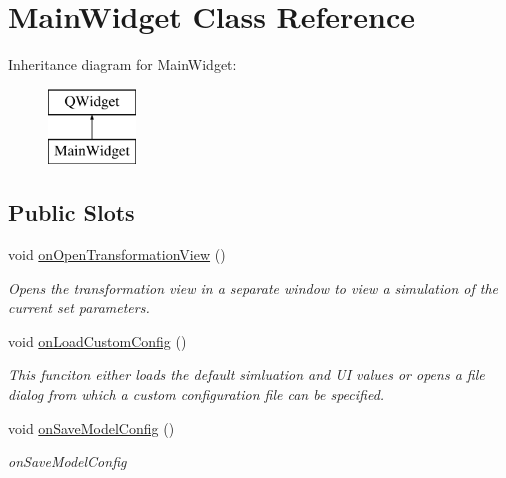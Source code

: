 \hypertarget{class_main_widget}{}\section{Main\+Widget Class Reference}
\label{class_main_widget}
Inheritance diagram for Main\+Widget\+:\begin{figure}[H]
\begin{center}
\leavevmode
\includegraphics[height=2.000000cm]{class_main_widget}
\end{center}
\end{figure}
\subsection*{Public Slots}
\begin{DoxyCompactItemize}
\item 
\mbox{\label{class_main_widget_af956e8da220cd6ca378cfc0eff118fda}} 
void \mbox{\hyperlink{class_main_widget_af956e8da220cd6ca378cfc0eff118fda}{on\+Open\+Transformation\+View}} ()
\begin{DoxyCompactList}\small\item\em Opens the transformation view in a separate window to view a simulation of the current set parameters. \end{DoxyCompactList}\item 
\mbox{\label{class_main_widget_aaef2b6704ce08fc8b2e5ed875fb6723a}} 
void \mbox{\hyperlink{class_main_widget_aaef2b6704ce08fc8b2e5ed875fb6723a}{on\+Load\+Custom\+Config}} ()
\begin{DoxyCompactList}\small\item\em This funciton either loads the default simluation and UI values or opens a file dialog from which a custom configuration file can be specified. \end{DoxyCompactList}\item 
\mbox{\label{class_main_widget_ac0de890595886748baeb468f5b234f0f}} 
void \mbox{\hyperlink{class_main_widget_ac0de890595886748baeb468f5b234f0f}{on\+Save\+Model\+Config}} ()
\begin{DoxyCompactList}\small\item\em on\+Save\+Model\+Config \end{DoxyCompactList}\end{DoxyCompactItemize}
